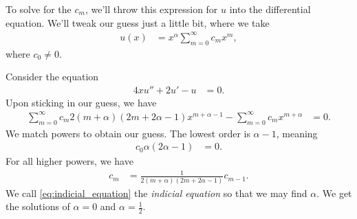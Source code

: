 \documentclass[10pt]{mypackage}
\begin{document}
  To solve for the $c_m$, we'll throw this expression for $u$ into the differential equation. We'll tweak our guess just a little bit, where we take
  \begin{align*}
    u(x) &= x^{\alpha} \sum_{m=0}^{\infty}c_mx^{m},\label{eq:series_solution_guess}\tag{$\ddag$}
  \end{align*}
  where $c_0 \neq 0$.
  \begin{example}
    Consider the equation
    \begin{align*}
      4xu'' + 2u' - u &= 0.
    \end{align*}
    Upon sticking in our guess, we have
    \begin{align*}
      \sum_{m=0}^{\infty}c_m2\left( m + \alpha \right)\left( 2m + 2\alpha - 1 \right)x^{m + \alpha - 1} - \sum_{m=0}^{\infty}c_mx^{m + \alpha} &= 0.
    \end{align*}
    We match powers to obtain our guess. The lowest order is $\alpha - 1$, meaning
    \begin{align*}
      c_0\alpha\left( 2\alpha - 1 \right) &= 0.\label{eq:indicial_equation}\tag{$\ast$}
    \end{align*}
    For all higher powers, we have
    \begin{align*}
      c_m &= \frac{1}{2\left( m+\alpha \right)\left( 2m + 2\alpha - 1 \right)}c_{m-1}. \label{eq:two_term_recurrence_series_solution}\tag{$\dag$}
    \end{align*}
    We call \eqref{eq:indicial_equation} the \textit{indicial equation} so that we may find $\alpha$. We get the solutions of $\alpha = 0$ and $\alpha = \frac{1}{2}$.\newline
    

\end{example}
\end{document}

